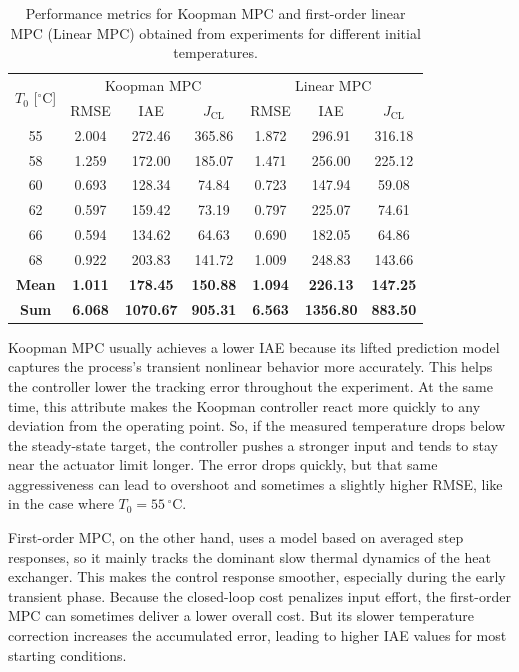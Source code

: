 \begin{table}[!t]
\centering
\caption{Performance metrics for Koopman MPC and first-order linear MPC (Linear MPC) obtained from experiments for different initial temperatures.}
\label{tab:performance_metrics_exp}
\begin{tabular}{c|ccc|ccc}
\hline
\multirow{2}{*}{$T_0$ [$^\circ$C]} &
\multicolumn{3}{c|}{Koopman MPC} &
\multicolumn{3}{c}{Linear MPC} \\
& RMSE & IAE & $J_{\mathrm{CL}}$ &
RMSE & IAE & $J_{\mathrm{CL}}$ \\
\hline
55 & 2.004  & 272.46 & 365.86 & 1.872 & 296.91 & 316.18 \\
58 & 1.259  & 172.00 & 185.07 & 1.471 & 256.00 & 225.12 \\
60 & 0.693  & 128.34 & 74.84  & 0.723 & 147.94 & 59.08  \\
62 & 0.597  & 159.42 & 73.19  & 0.797 & 225.07 & 74.61  \\
66 & 0.594  & 134.62 & 64.63  & 0.690 & 182.05 & 64.86  \\
68 & 0.922  & 203.83 & 141.72 & 1.009 & 248.83 & 143.66 \\
\hline
\textbf{Mean} &
\textbf{1.011} & \textbf{178.45} & \textbf{150.88} &
\textbf{1.094} & \textbf{226.13} & \textbf{147.25} \\
\textbf{Sum}  &
\textbf{6.068} & \textbf{1070.67} & \textbf{905.31} &
\textbf{6.563} & \textbf{1356.80} & \textbf{883.50} \\
\hline
\end{tabular}
\end{table}



Koopman MPC usually achieves a lower IAE because its lifted prediction model captures the process's transient nonlinear behavior more accurately. This helps the controller lower the tracking error throughout the experiment. At the same time, this attribute makes the Koopman controller react more quickly to any deviation from the operating point. So, if the measured temperature drops below the steady-state target, the controller pushes a stronger input and tends to stay near the actuator limit longer. The error drops quickly, but that same aggressiveness can lead to overshoot and sometimes a slightly higher RMSE, like in the case where $T_0 = 55\,^{\circ}\mathrm{C}$.

First-order MPC, on the other hand, uses a model based on averaged step responses, so it mainly tracks the dominant slow thermal dynamics of the heat exchanger. This makes the control response smoother, especially during the early transient phase. Because the closed-loop cost penalizes input effort, the first-order MPC can sometimes deliver a lower overall cost. But its slower temperature correction increases the accumulated error, leading to higher IAE values for most starting conditions.


